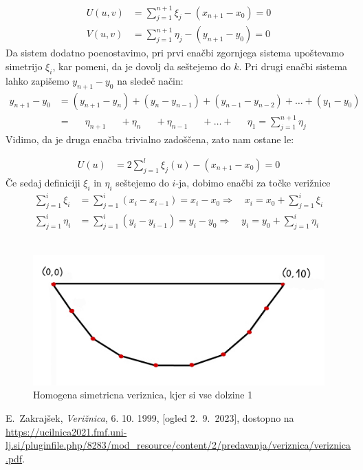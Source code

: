 \documentclass[a4paper,12pt]{article}
\begin{document}
\begin{align*}
    U(u,v) &= \sum_{j=1}^{n+1} \xi_j - (x_{n+1} - x_0) = 0 \\
    V(u,v) &= \sum_{j=1}^{n+1} \eta_j - (y_{n+1} - y_0) = 0
\end{align*}
Da sistem dodatno poenostavimo, pri prvi enačbi zgornjega sistema upoštevamo simetrijo $\xi_i$, kar pomeni, da je dovolj da seštejemo do $k$. Pri drugi enačbi
sistema lahko zapišemo $y_{n+1} - y_0$ na sledeč način:
\begin{align*}
    y_{n+1} - y_0 &= (y_{n+1} - y_{n}) + (y_{n} - y_{n-1}) + (y_{n-1} - y_{n-2}) + \dots + (y_{1} - y_{0}) \\
            &= \quad \> \> \eta_{n+1} \quad \> \> + \eta_{n} \quad \> \> + \eta_{n-1} \quad \> \> + \dots + \quad \> \>\eta_1 = \sum_{j=1}^{n+1} \eta_j
\end{align*}
Vidimo, da je druga enačba trivialno zadoščena, zato nam ostane le:

\begin{align}
    U(u) &= 2 \sum_{j=1}^{l} \xi_j(u) - (x_{n+1} - x_0) = 0 \label{en_U}
\end{align}
Če sedaj definiciji $\xi_i$ in $\eta_i$ seštejemo do $i$-ja, dobimo enačbi za 
točke verižnice
\begin{align}
    \sum_{j=1}^i \xi_i &= \sum_{j=1}^i (x_i - x_{i-1}) = x_i - x_0 \Rightarrow \quad x_i = x_0 + \sum_{j=1}^i \xi_i \\
    \sum_{j=1}^i \eta_i &= \sum_{j=1}^i (y_i - y_{i-1}) = y_i - y_0 \Rightarrow \quad y_i = y_0 + \sum_{j=1}^i \eta_i 
\end{align}
\\
\begin{figure}[h]
    \center
	\includegraphics[scale=0.1]{sim_ver}
	\caption{Homogena simetricna veriznica, kjer si vse dolzine 1}
\end{figure}

\begin{thebibliography}{99}

    E.~Zakrajšek, \emph{Verižnica}, 6. 10. 1999, [ogled 2.~9.~2023], dostopno na \url{https://ucilnica2021.fmf.uni-lj.si/pluginfile.php/8283/mod_resource/content/2/predavanja/veriznica/veriznica.pdf}.
\end{thebibliography}
\end{document}
